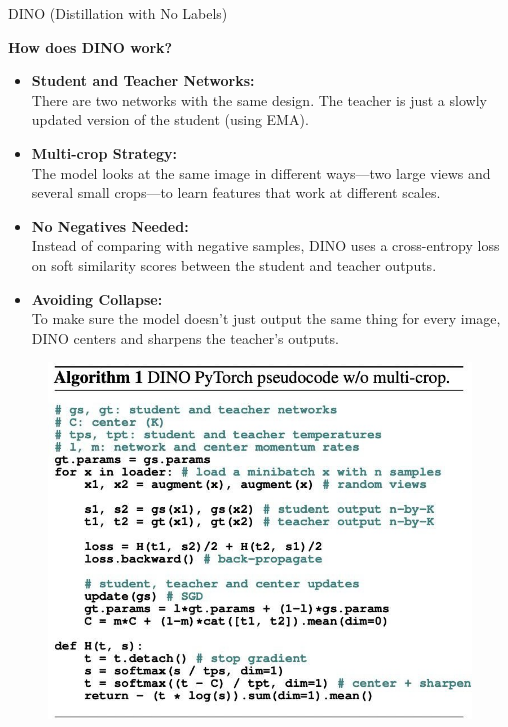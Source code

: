 \begin{frame}[allowframebreaks]{DINO (Distillation with No Labels)}
\framebreak

\textbf{How does DINO work?}
\begin{itemize}
    \item \textbf{Student and Teacher Networks:} \\
    There are two networks with the same design. The teacher is just a slowly updated version of the student (using EMA).
    \item \textbf{Multi-crop Strategy:} \\
    The model looks at the same image in different ways—two large views and several small crops—to learn features that work at different scales.
    \item \textbf{No Negatives Needed:} \\
    Instead of comparing with negative samples, DINO uses a cross-entropy loss on soft similarity scores between the student and teacher outputs.
    \item \textbf{Avoiding Collapse:} \\
    To make sure the model doesn't just output the same thing for every image, DINO centers and sharpens the teacher's outputs.
\end{itemize}

\framebreak

\begin{figure}
    \centering
    \includegraphics[width=\linewidth,height=0.9\textheight,keepaspectratio]{images/contrastive/slide_88_1_img.jpg}
\end{figure}


\end{frame}
